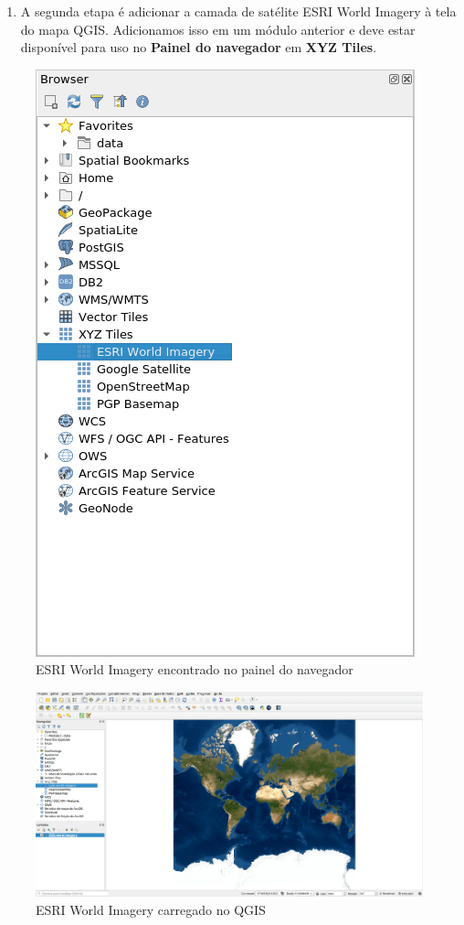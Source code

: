 \documentclass[
]{krantz}
\providecommand{\tightlist}{%
  \setlength{\itemsep}{0pt}\setlength{\parskip}{0pt}}
\begin{document}
\begin{enumerate}
\def\labelenumi{\arabic{enumi}.}
\setcounter{enumi}{3}
\tightlist
\item
  A segunda etapa é adicionar a camada de satélite ESRI World Imagery à tela do mapa QGIS. Adicionamos isso em um módulo anterior e deve estar disponível para uso no \textbf{Painel do navegador} em \textbf{XYZ Tiles}.
\end{enumerate}

\begin{figure}
\centering
\includegraphics{media/modulo7/xyz-2.png}
\caption{ESRI World Imagery encontrado no painel do navegador}
\end{figure}

\begin{figure}
\centering
\includegraphics{media/modulo7/xyz-3.png}
\caption{ESRI World Imagery carregado no QGIS}
\end{figure}
\end{document}
